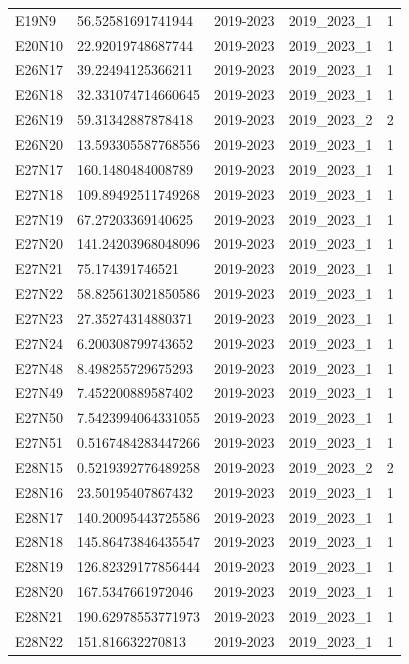 \begin{landscape}
\begin{longtable}{lllll}
E19N9 & 56.52581691741944 & 2019-2023 & 2019\_2023\_1 & 1 \\
E20N10 & 22.92019748687744 & 2019-2023 & 2019\_2023\_1 & 1 \\
E26N17 & 39.22494125366211 & 2019-2023 & 2019\_2023\_1 & 1 \\
E26N18 & 32.331074714660645 & 2019-2023 & 2019\_2023\_1 & 1 \\
E26N19 & 59.31342887878418 & 2019-2023 & 2019\_2023\_2 & 2 \\
E26N20 & 13.593305587768556 & 2019-2023 & 2019\_2023\_1 & 1 \\
E27N17 & 160.1480484008789 & 2019-2023 & 2019\_2023\_1 & 1 \\
E27N18 & 109.89492511749268 & 2019-2023 & 2019\_2023\_1 & 1 \\
E27N19 & 67.27203369140625 & 2019-2023 & 2019\_2023\_1 & 1 \\
E27N20 & 141.24203968048096 & 2019-2023 & 2019\_2023\_1 & 1 \\
E27N21 & 75.174391746521 & 2019-2023 & 2019\_2023\_1 & 1 \\
E27N22 & 58.825613021850586 & 2019-2023 & 2019\_2023\_1 & 1 \\
E27N23 & 27.35274314880371 & 2019-2023 & 2019\_2023\_1 & 1 \\
E27N24 & 6.200308799743652 & 2019-2023 & 2019\_2023\_1 & 1 \\
E27N48 & 8.498255729675293 & 2019-2023 & 2019\_2023\_1 & 1 \\
E27N49 & 7.452200889587402 & 2019-2023 & 2019\_2023\_1 & 1 \\
E27N50 & 7.5423994064331055 & 2019-2023 & 2019\_2023\_1 & 1 \\
E27N51 & 0.5167484283447266 & 2019-2023 & 2019\_2023\_1 & 1 \\
E28N15 & 0.5219392776489258 & 2019-2023 & 2019\_2023\_2 & 2 \\
E28N16 & 23.50195407867432 & 2019-2023 & 2019\_2023\_1 & 1 \\
E28N17 & 140.20095443725586 & 2019-2023 & 2019\_2023\_1 & 1 \\
E28N18 & 145.86473846435547 & 2019-2023 & 2019\_2023\_1 & 1 \\
E28N19 & 126.82329177856444 & 2019-2023 & 2019\_2023\_1 & 1 \\
E28N20 & 167.5347661972046 & 2019-2023 & 2019\_2023\_1 & 1 \\
E28N21 & 190.62978553771973 & 2019-2023 & 2019\_2023\_1 & 1 \\
E28N22 & 151.816632270813 & 2019-2023 & 2019\_2023\_1 & 1 \\

\end{longtable}
\end{landscape}
